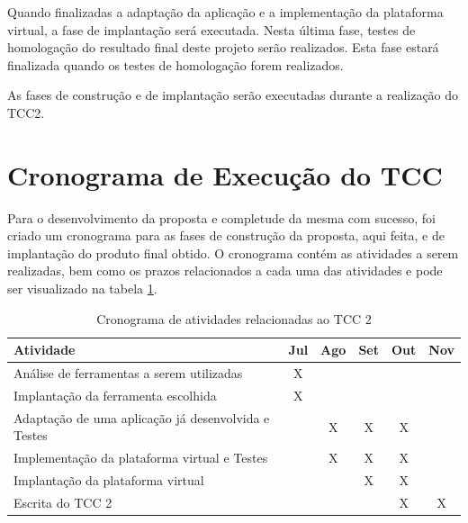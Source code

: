 Quando finalizadas a adaptação da aplicação e a implementação da plataforma virtual, a fase de implantação será executada. Nesta última fase, testes de homologação do resultado final deste projeto serão realizados. Esta fase estará finalizada quando os testes de homologação forem realizados.

As fases de construção e de implantação serão executadas durante a realização do TCC2.

\section{Cronograma de Execução do TCC}
Para o desenvolvimento da proposta e completude da mesma com sucesso, foi criado um cronograma para as fases de construção da proposta, aqui feita, e de implantação do produto final obtido. O cronograma contém as atividades a serem realizadas, bem como os prazos relacionados a cada uma das atividades e pode ser visualizado na tabela \ref{cronograma_tcc2}.

\begin{table}[!h]
\centering
\caption{Cronograma de atividades relacionadas ao TCC 2}
\label{cronograma_tcc2}
\begin{tabular}{|p{9cm}|c|c|c|c|c|}
\hline
Atividade                                                   & \multicolumn{1}{l|}{Jul} & \multicolumn{1}{l|}{Ago} & \multicolumn{1}{l|}{Set} & \multicolumn{1}{l|}{Out} & \multicolumn{1}{l|}{Nov} \\ \hline
Análise de ferramentas a serem utilizadas                   & X                           &                             &                              &                            &                             \\ \hline
Implantação da ferramenta escolhida                         & X                           &                             &                              &                            &                             \\ \hline
Adaptação de uma aplicação já desenvolvida e Testes         &                             & X                              & X                            & X                          &                              \\ \hline
Implementação da plataforma virtual e Testes                &                             & X                          & X                            & X                          &                             \\ \hline
Implantação da plataforma virtual                           &                             &                            & X                          & X                            &                             \\ \hline
Escrita do TCC 2                                            &                             &                             &                            & X                            & X                           \\ \hline
\end{tabular}
\end{table}


